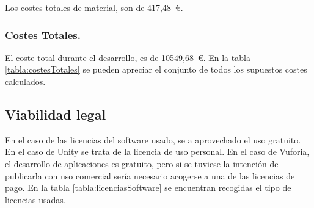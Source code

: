 Los costes totales de material, son de 417,48~\euro.




\subsubsection{Costes Totales.}

	El coste total durante el desarrollo, es de 10549,68~\euro. En la tabla \ref{tabla:costesTotales} se pueden apreciar el conjunto de todos los supuestos costes calculados.
	

\subsection{Viabilidad legal}

En el caso de las licencias del software usado, se a aprovechado el uso gratuito. En el caso de Unity se trata de la licencia de uso personal. En el caso de Vuforia, el desarrollo de aplicaciones es gratuito, pero si se tuviese la intención de publicarla con uso comercial sería necesario acogerse a una de las licencias de pago. En la tabla \ref{tabla:licenciasSoftware} se encuentran recogidas el tipo de licencias usadas.

